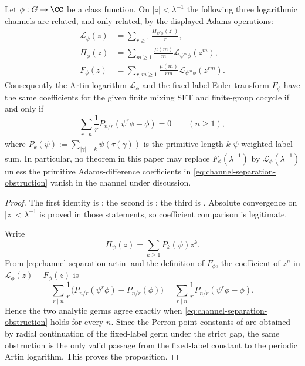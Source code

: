 \begin{proposition}
  \label{prop:logarithmic-channel-separation}
  Let \(\phi:G\to\CC\) be a class function. On \(|z|<\lambda^{-1}\) the
  following three logarithmic channels are related, and only related, by
  the displayed Adams operations:
  \begin{align}
    \mathcal L_\phi(z)
    &=\sum_{r\ge1}\frac{\Pi_{\psi^r\phi}(z^r)}{r},
      \label{eq:channel-separation-artin}\\
    \Pi_\phi(z)
    &=\sum_{m\ge1}\frac{\mu(m)}{m}
      \mathcal L_{\psi^m\phi}(z^m),
      \label{eq:channel-separation-primitive}\\
    F_\phi(z)
    &=\sum_{r,m\ge1}\frac{\mu(m)}{rm}
      \mathcal L_{\psi^m\phi}(z^{rm}).
      \label{eq:channel-separation-fixed}
  \end{align}
  Consequently the Artin logarithm \(\mathcal L_\phi\) and the fixed-label
  Euler transform \(F_\phi\) have the same coefficients for the given
  finite mixing SFT and finite-group cocycle if and only if
  \begin{equation}\label{eq:channel-separation-obstruction}
    \sum_{r\mid n}\frac{1}{r}
      P_{n/r}(\psi^r\phi-\phi)=0
    \qquad(n\ge1),
  \end{equation}
  where
  \(P_k(\psi):=\sum_{|\gamma|=k}\psi(\tau(\gamma))\) is the primitive
  length-\(k\) \(\psi\)-weighted label sum. In particular, no theorem in
  this paper may replace \(F_\phi(\lambda^{-1})\) by
  \(\mathcal L_\phi(\lambda^{-1})\) unless the primitive
  Adams-difference coefficients in \eqref{eq:channel-separation-obstruction}
  vanish in the channel under discussion.
\end{proposition}

\begin{proof}
  The first identity is ; the
  second is ; the third is
  . Absolute convergence on
  \(|z|<\lambda^{-1}\) is proved in those statements, so coefficient
  comparison is legitimate.

  Write
  \[
    \Pi_\psi(z)=\sum_{k\ge1}P_k(\psi)z^k.
  \]
  From \eqref{eq:channel-separation-artin} and the definition of
  \(F_\phi\), the coefficient of \(z^n\) in
  \(\mathcal L_\phi(z)-F_\phi(z)\) is
  \[
    \sum_{r\mid n}\frac{1}{r}
      \bigl(P_{n/r}(\psi^r\phi)-P_{n/r}(\phi)\bigr)
    =
    \sum_{r\mid n}\frac{1}{r}P_{n/r}(\psi^r\phi-\phi).
  \]
  Hence the two analytic germs agree exactly when
  \eqref{eq:channel-separation-obstruction} holds for every \(n\). Since
  the Perron-point constants of  are
  obtained by radial continuation of the fixed-label germ under the strict
  gap, the same obstruction is the only valid passage from the fixed-label
  constant to the periodic Artin logarithm. This proves the proposition.
\end{proof}


